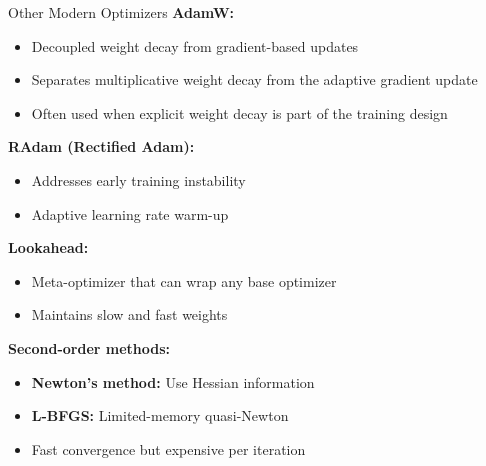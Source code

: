 \documentclass[aspectratio=169]{beamer}
\begin{document}
\begin{frame}{Other Modern Optimizers}
  \textbf{AdamW:}
  \begin{itemize}
    \item Decoupled weight decay from gradient-based updates
    \item Separates multiplicative weight decay from the adaptive gradient update
    \item Often used when explicit weight decay is part of the training design
  \end{itemize}

  \vspace{0.5em}

  \textbf{RAdam (Rectified Adam):}
  \begin{itemize}
    \item Addresses early training instability
    \item Adaptive learning rate warm-up
  \end{itemize}

  \vspace{0.5em}

  \textbf{Lookahead:}
  \begin{itemize}
    \item Meta-optimizer that can wrap any base optimizer
    \item Maintains slow and fast weights
  \end{itemize}

  \vspace{0.5em}

  \textbf{Second-order methods:}
  \begin{itemize}
    \item \textbf{Newton's method:} Use Hessian information
    \item \textbf{L-BFGS:} Limited-memory quasi-Newton
    \item Fast convergence but expensive per iteration
  \end{itemize}
\end{frame}
\end{document}
